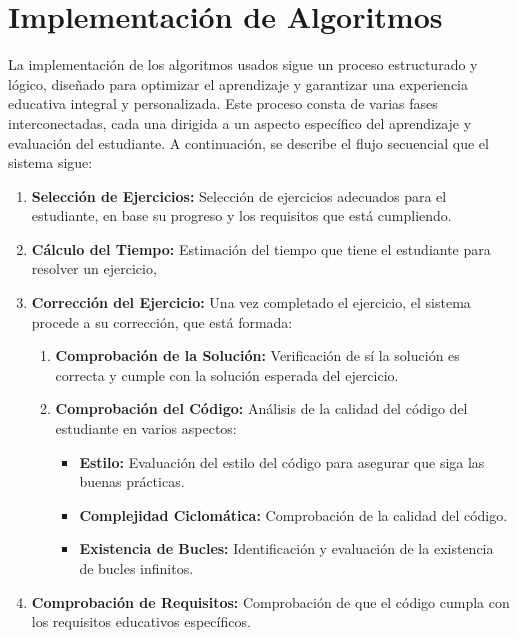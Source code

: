 \section{Implementación de Algoritmos}

La implementación de los algoritmos usados sigue un proceso estructurado y lógico, diseñado para optimizar el aprendizaje y garantizar una experiencia educativa integral y personalizada. Este proceso consta de varias fases interconectadas, cada una dirigida a un aspecto específico del aprendizaje y evaluación del estudiante. A continuación, se describe el flujo secuencial que el sistema sigue:

\begin{enumerate}
    \item \textbf{Selección de Ejercicios:} Selección de ejercicios adecuados para el estudiante, en base su progreso y los requisitos que está cumpliendo.

    \item \textbf{Cálculo del Tiempo:} Estimación del tiempo que tiene el estudiante para resolver un ejercicio,

    \item \textbf{Corrección del Ejercicio:} Una vez completado el ejercicio, el sistema procede a su corrección, que está formada:

    \begin{enumerate}
        \item \textbf{Comprobación de la Solución:} Verificación de sí la solución es correcta y cumple con la solución esperada del ejercicio.
        \item \textbf{Comprobación del Código:} Análisis de la calidad del código del estudiante en varios aspectos:
        \begin{itemize}
            \item \textbf{Estilo:} Evaluación del estilo del código para asegurar que siga las buenas prácticas.
            \item \textbf{Complejidad Ciclomática:} Comprobación de la calidad del código.
            \item \textbf{Existencia de Bucles:} Identificación y evaluación de la existencia de bucles infinitos. 
        \end{itemize}
    \end{enumerate}

    \item \textbf{Comprobación de Requisitos:} Comprobación de que el código cumpla con los requisitos educativos específicos.


\end{enumerate}
